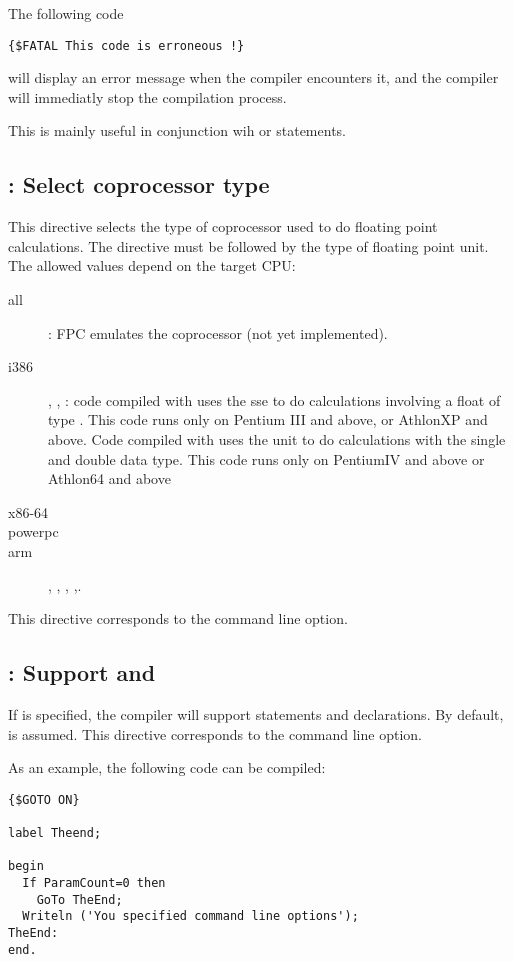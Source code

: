 The following code
\begin{verbatim}
{$FATAL This code is erroneous !}
\end{verbatim}
will display an error message when the compiler encounters it,
and the compiler will immediatly stop the compilation process.

This is mainly useful in conjunction wih  or
 statements.

\subsection{ : Select coprocessor type}

This directive selects the type of coprocessor used to do floating point
calculations. The directive must be followed by the type of floating point
unit. The allowed values depend on the target CPU:

\begin{description}
\item[all] : FPC emulates the coprocessor (not yet implemented).
\item[i386] , , : code compiled with  
uses the sse to do calculations involving a float of type .
This code runs only on Pentium III and above, or AthlonXP and above.
Code compiled with  uses the  unit to do calculations 
with the single and double data type. This code runs only on PentiumIV 
and above or Athlon64 and above 
\item[x86-64]  
\item[powerpc]  
\item[arm] , , , ,.
\end{description} 

This directive corresponds to the  command line option.

\subsection{ : Support  and }

If  is specified, the compiler will support 
statements and  declarations. By default,  is
assumed. This directive corresponds to the  command line option.

As an example, the following code can be compiled:
\begin{verbatim}
{$GOTO ON}

label Theend;

begin
  If ParamCount=0 then
    GoTo TheEnd;
  Writeln ('You specified command line options');
TheEnd:
end.
\end{verbatim}


